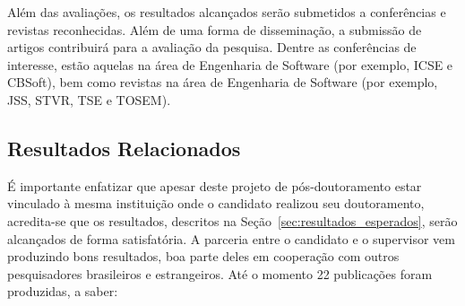 \documentclass[12pt]{article}
\begin{document}
Além das avaliações, os resultados alcançados serão submetidos a conferências e revistas reconhecidas. Além de uma forma de disseminação, a submissão de artigos contribuirá para a avaliação da pesquisa. Dentre as conferências de interesse, estão aquelas na área de Engenharia de Software (por exemplo, ICSE e CBSoft), bem como revistas na área de Engenharia de Software (por exemplo, JSS, STVR, TSE e TOSEM).

\subsection{Resultados Relacionados}

É importante enfatizar que apesar deste projeto de pós-doutoramento estar vinculado à mesma instituição onde o candidato realizou seu doutoramento, acredita-se que os resultados, descritos na Seção~\ref{sec:resultados_esperados}, serão alcançados de forma satisfatória. A parceria entre o candidato e o supervisor vem produzindo bons resultados, boa parte deles em cooperação com outros pesquisadores brasileiros e estrangeiros. Até o momento 22 publicações foram produzidas, a saber:
\end{document}
